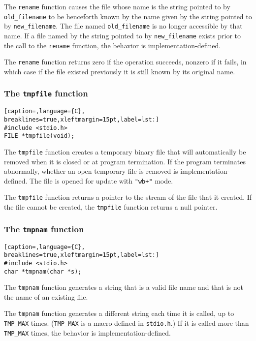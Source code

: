 The \texttt{rename} function causes the file whose name is the string pointed
to by \texttt{old\_filename} to be henceforth known by the name given by the
string pointed to by \texttt{new\_filename}. The file named
\texttt{old\_filename} is no longer accessible by that name. If a file named by
the string pointed to by \texttt{new\_filename} exists prior to the call to the
\texttt{rename} function, the behavior is implementation-defined.

The \texttt{rename} function returns zero if the operation succeeds, nonzero if
it fails, in which case if the file existed previously it is still known by its
original name.

\subsubsection{The \texttt{tmpfile} function}
\lstset{basicstyle=\scriptsize, numbers=left, captionpos=b, tabsize=4}
\begin{lstlisting}[caption=,language={C},
breaklines=true,xleftmargin=15pt,label=lst:]
#include <stdio.h>
FILE *tmpfile(void);
\end{lstlisting}

The \texttt{tmpfile} function creates a temporary binary file that will
automatically be removed when it is closed or at program termination. If the
program terminates abnormally, whether an open temporary file is removed is
implementation-defined. The file is opened for update with \texttt{"wb+"} mode.

The \texttt{tmpfile} function returns a pointer to the stream of the file that
it created. If the file cannot be created, the \texttt{tmpfile} function
returns a null pointer.

\subsubsection{The \texttt{tmpnam} function}
\lstset{basicstyle=\scriptsize, numbers=left, captionpos=b, tabsize=4}
\begin{lstlisting}[caption=,language={C},
breaklines=true,xleftmargin=15pt,label=lst:]
#include <stdio.h>
char *tmpnam(char *s);
\end{lstlisting}

The \texttt{tmpnam} function generates a string that is a valid file name and
that is not the name of an existing file.

The \texttt{tmpnam} function generates a different string each time it is
called, up to \texttt{TMP\_MAX} times. (\texttt{TMP\_MAX} is a macro defined in
\texttt{stdio.h}.) If it is called more than \texttt{TMP\_MAX} times, the
behavior is implementation-defined.


